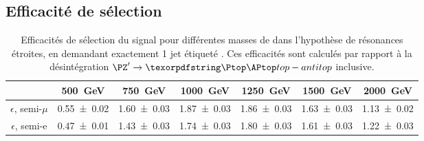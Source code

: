 
\subsection{Efficacité de sélection}

\begin{table}[p!] \centering
  \begin{tabular}{ccccccc} \toprule
    & \SI{500}{\GeV} & \SI{750}{\GeV} & \SI{1000}{\GeV} & \SI{1250}{\GeV} & \SI{1500}{\GeV} & \SI{2000}{\GeV} \\ \midrule
    $\epsilon$, semi-$\mu$ & \num{0.55 \pm 0.02} & \num{1.60 \pm 0.03} & \num{1.87 \pm 0.03} & \num{1.86 \pm 0.03} & \num{1.63 \pm 0.03} & \num{1.13 \pm 0.02} \\
    $\epsilon$, semi-e & \num{0.47 \pm 0.01} & \num{1.43 \pm 0.03} & \num{1.74 \pm 0.03} & \num{1.80 \pm 0.03} & \num{1.61 \pm 0.03} & \num{1.22 \pm 0.03} \\ \bottomrule
  \end{tabular}
  \caption{Efficacités de sélection du signal pour différentes masses de \zprime dans l'hypothèse de résonances étroites, en demandant exactement 1 jet étiqueté \Pbottom. Ces efficacités sont calculés par rapport à la désintégration $\zprime \rightarrow \ttbar$ inclusive.}
  \label{tab:eff_narrow_1b}
\end{table}

